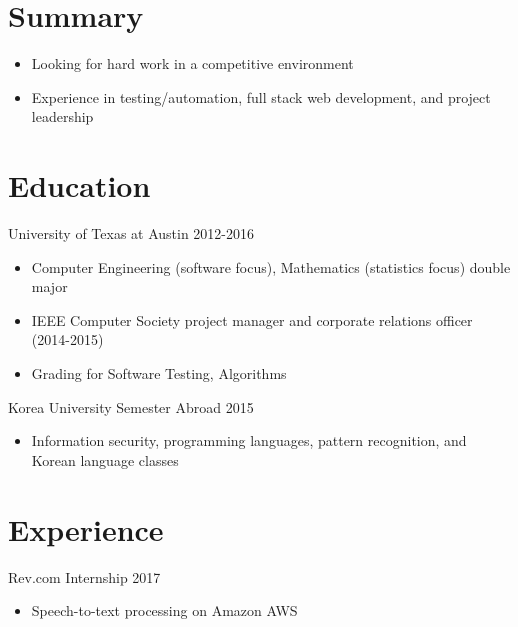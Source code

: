 \documentclass[line,margin]{res}
\begin{document}
    \address{\href{mailto:jdong42@gmail.com}{jdong42@gmail.com}}

\begin{resume}

\vspace{-8pt}
\section{Summary}
    \vspace{22pt}
        \begin{itemize} \itemsep -2pt
        \item Looking for hard work in a competitive environment
        \item Experience in testing/automation, full stack web development, and project leadership 
        \end{itemize}

   
\vspace{-8pt}
\section{Education} 
    \vspace{12pt}
    University of Texas at Austin \hfill 2012-2016 \\
    \vspace{-12pt}
        \begin{itemize} \itemsep -2pt
        \item Computer Engineering (software focus), Mathematics (statistics focus) double major
        \item IEEE Computer Society project manager and corporate relations officer (2014-2015)
        \item Grading for Software Testing, Algorithms
        \end{itemize}
     
    \vspace{-8pt}
    Korea University Semester Abroad \hfill 2015 \\
    \vspace{-12pt}
        \begin{itemize} \itemsep -2pt
        \item Information security, programming languages, pattern recognition, and Korean language classes
        \end{itemize}
  

\vspace{-8pt}
\section{Experience} 
    \vspace{12pt}
    Rev.com Internship
    \hfill  2017
        \begin{itemize} \itemsep -2pt
        \item Speech-to-text processing on Amazon AWS
        \end{itemize}


\end{resume}
\end{document}
